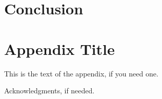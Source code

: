 \documentclass{sigplanconf}
\begin{document}
\section{Conclusion}

\begin{figure}
  
  \caption{}
\end{figure}

\begin{figure}
  
  \caption{}
\end{figure}

\begin{figure}
  
  \caption{}
\end{figure}

\begin{figure}
  
  \caption{}
\end{figure}


\appendix
\section{Appendix Title}

This is the text of the appendix, if you need one.

\acks

Acknowledgments, if needed.


\makeatletter
  \def\@seccntformat#1{Appendix~\csname the#1\endcsname:\quad}
\makeatother




\end{document}
